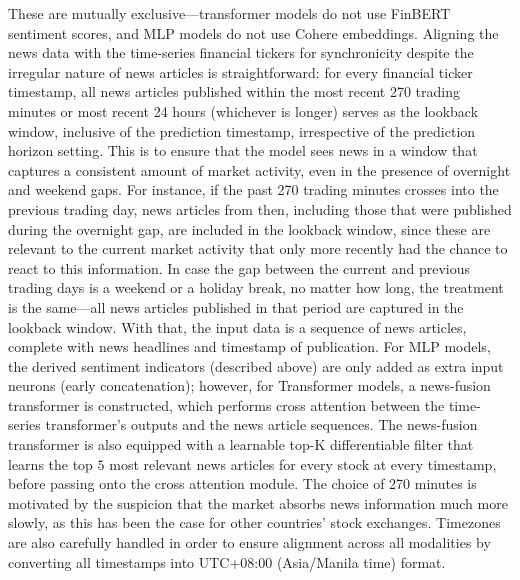\documentclass[stu,floatsintext]{apa7}
\begin{document}
\begin{enumerate}
These are mutually exclusive—transformer models do not use FinBERT sentiment scores, and MLP models do not use Cohere embeddings. Aligning the news data with the time-series financial tickers for synchronicity despite the irregular nature of news articles is straightforward: for every financial ticker timestamp, all news articles published within the most recent 270 trading minutes or most recent 24 hours (whichever is longer) serves as the lookback window, inclusive of the prediction timestamp, irrespective of the prediction horizon setting. This is to ensure that the model sees news in a window that captures a consistent amount of market activity, even in the presence of overnight and weekend gaps. For instance, if the past 270 trading minutes crosses into the previous trading day, news articles from then, including those that were published during the overnight gap, are included in the lookback window, since these are relevant to the current market activity that only more recently had the chance to react to this information. In case the gap between the current and previous trading days is a weekend or a holiday break, no matter how long, the treatment is the same—all news articles published in that period are captured in the lookback window. With that, the input data is a sequence of news articles, complete with news headlines and timestamp of publication. For MLP models, the derived sentiment indicators (described above) are only added as extra input neurons (early concatenation); however, for Transformer models, a news-fusion transformer is constructed, which performs cross attention between the time-series transformer's outputs and the news article sequences. The news-fusion transformer is also equipped with a learnable top-K differentiable filter that learns the top $5$ most relevant news articles for every stock at every timestamp, before passing onto the cross attention module. The choice of 270 minutes is motivated by the suspicion that the market absorbs news information much more slowly, as this has been the case for other countries’ stock exchanges. Timezones are also carefully handled in order to ensure alignment across all modalities by converting all timestamps into UTC+08:00 (Asia/Manila time) format.

\end{enumerate}
\end{document}
